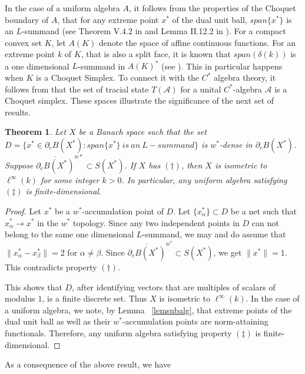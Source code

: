 \documentclass[11pt]{amsart}
\newtheorem{thm}{Theorem}
\begin{document}
In the case of a uniform algebra $A$, it follows from the properties of the Choquet boundary of $A$, that for any extreme point $x^*$ of the dual unit ball, $span\{x^*\}$ is an $L$-summand (see Theorem V.4.2 in \cite{HWW} and Lemma II.12.2 in \cite{Ga}). For a compact convex set $K$, let $A(K)$ denote the space of affine continuous functions. For an extreme point $k$ of $K$, that is also a split face, it is known that $span(\delta(k))$ is a one dimensional $L$-summand in $A(K)^*$ (see \cite[Chapter 3, Theorem 8.3]{AE}). This in particular happens when $K$ is a Choquet Simplex. To connect it with the $C^*$ algebra theory, it follows from \cite[Thoerem 1.1]{BR} that the set of tracial state $T(\mathcal{A})$ for a unital $C^*$-algebra $\mathcal{A}$ is a Choquet simplex. These spaces illustrate the significance of the next set of results.

\begin{thm} \label{thmunialg}
Let $X$ be a Banach space such that the set $D= \{x^\ast \in \partial_e B(X^*): span\{x^\ast\}~is~an~L-summand\}$ is $w^*$-dense in $\partial_e B(X^*)$. Suppose $\overline{\partial_e B(X^*)}^{w\ast} \subset S(X^*)$. If $X$ has $(\dag)$, then $X$ is isometric to $\ell^\infty(k)$ for some integer $k>0$. In particular, any uniform algebra satisfying $(\ddag)$ is finite-dimensional.
\end{thm}

\begin{proof} 

Let $x^\ast$ be a $w^*$-accumulation point of $D$. Let $\{x^\ast_{\alpha}\} \subset D$ be a net such that $x^\ast_{\alpha} \rightarrow x^\ast$ in the $w^*$ topology. Since any two independent  points in $D$ can not belong to the same one dimensional $L$-summand, we may and do assume that $\|x^\ast_{\alpha}-x^\ast_{\beta}\| =2 $ for $\alpha \neq \beta$. Since $\overline {\partial_e B(X^*)}^{w^*} \subset S(X^\ast)$, we get $\|x^\ast\|=1$. This contradicts property $(\dag)$.

This shows that $D$, after identifying vectors that are multiples of scalars of modulus $1$, is a finite  discrete set. Thus $X$ is isometric to $\ell^\infty(k)$. In the case of a uniform algebra, we note, by Lemma ~\ref{lemsubalg}, that extreme points of the dual unit ball as well as their $w^*$-accumulation points are norm-attaining functionals.	Therefore, any uniform algebra satisfying property $(\ddag)$ is finite-dimensional.
\end{proof}

As a consequence of the above result, we have
\end{document}

